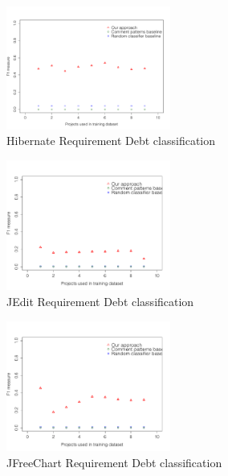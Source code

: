 \clearpage

\begin{figure}[thb!]
  \centering
  \includegraphics[width=0.48\textwidth]{figures/appendix/iteration_details/implementation_hibernate.pdf}
  \caption{Hibernate Requirement Debt classification}
  \label{fig:implementation_hibernate}
\end{figure}

\begin{figure}[thb!]
  \centering
  \includegraphics[width=0.48\textwidth]{figures/appendix/iteration_details/implementation_jedit.pdf}
  \vspace{-3mm}
  \caption{JEdit Requirement Debt classification}
  \label{fig:implementation_jedit}
\end{figure}

\begin{figure}[thb!]
  \centering
  \includegraphics[width=0.48\textwidth]{figures/appendix/iteration_details/implementation_jfreechart.pdf}
  \vspace{-3mm}
  \caption{JFreeChart Requirement Debt classification}
  \label{fig:implementation_jfreechart}
\end{figure}

